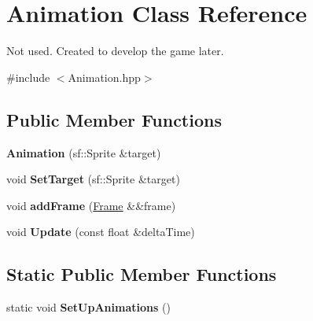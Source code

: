 \hypertarget{class_animation}{}\section{Animation Class Reference}
\label{class_animation}


Not used. Created to develop the game later.  




{\ttfamily \#include $<$Animation.\+hpp$>$}

\subsection*{Public Member Functions}
\begin{DoxyCompactItemize}
\item 
\mbox{\label{class_animation_a7a4a824011f759753b154c8485a92221}} 
{\bfseries Animation} (sf\+::\+Sprite \&target)
\item 
\mbox{\label{class_animation_a98e985e499340c977fea284b5f6a25cd}} 
void {\bfseries Set\+Target} (sf\+::\+Sprite \&target)
\item 
\mbox{\label{class_animation_a49902c92e88eb4d36c16246322270ee8}} 
void {\bfseries add\+Frame} (\mbox{\hyperlink{struct_frame}{Frame}} \&\&frame)
\item 
\mbox{\label{class_animation_ae1f48f9c8e39534328af0edade5a57ee}} 
void {\bfseries Update} (const float \&delta\+Time)
\end{DoxyCompactItemize}
\subsection*{Static Public Member Functions}
\begin{DoxyCompactItemize}
\item 
\mbox{\label{class_animation_aa491d469f523112f4d97a34e25e51808}} 
static void {\bfseries Set\+Up\+Animations} ()
\end{DoxyCompactItemize}
